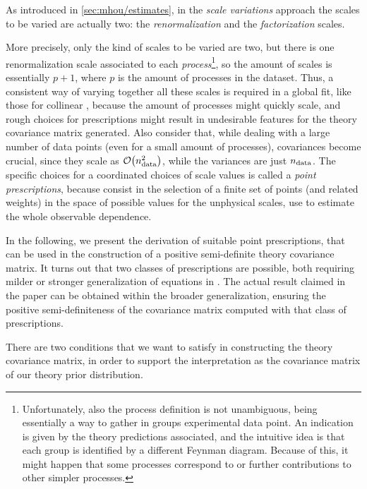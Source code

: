 
As introduced in \cref{sec:mhou/estimates}, in the \textit{scale variations}
approach the scales to be varied are actually two: the \textit{renormalization}
and the \textit{factorization} scales.

More precisely, only the kind of scales to be varied are two, but there is one
renormalization scale associated to each \textit{process}\footnote{
  Unfortunately, also the process definition is not unambiguous, being
  essentially a way to gather in groups experimental data point.
  An indication is given by the theory predictions associated, and the
  intuitive idea is that each group is identified by a different \lo Feynman
  diagram.
  Because of this, it might happen that some processes correspond to \nlo or
  further contributions to other simpler processes.
}, so the amount of scales is essentially $p + 1$, where $p$ is the amount of
processes in the dataset.
Thus, a consistent way of varying together all these scales is required in a
global \qcd fit, like those for collinear \pdfs, because the amount of
processes might quickly scale, and rough choices for prescriptions might result
in undesirable features for the theory covariance matrix generated.
Also consider that, while dealing with a large number of data points (even for
a small amount of processes), covariances become crucial, since they scale as
$\order{\nd^2}$, while the variances are just $n_{\text{data}}$.
The specific choices for a coordinated choices of scale values is called a
\textit{point prescriptions}, because consist in the selection of a finite set
of points (and related weights) in the space of possible values for the
unphysical scales, use to estimate the whole observable dependence.

In the following, we present the derivation of suitable point prescriptions,
that can be used in the construction of a positive semi-definite theory
covariance matrix.
It turns out that two classes of prescriptions are possible, both requiring
milder or stronger generalization of equations in \cite{NNPDF:2019ubu}.
The actual result claimed in the paper can be obtained within the broader
generalization, ensuring the positive semi-definiteness of the covariance
matrix computed with that class of prescriptions.

There are two conditions that we want to satisfy in constructing the theory
covariance matrix, in order to support the interpretation as the covariance
matrix of our theory prior distribution.

